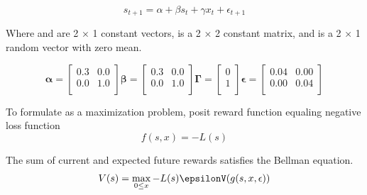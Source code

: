 \documentclass[a4paper,oneside]{article}
\begin{document}
\begin{equation}
	s_{t+1}= \alpha+\beta s_{t}+\gamma x_{t}+\epsilon_{t+1} 
	\label{eq:mye3}
\end{equation}

Where \textalpha \: and \textGamma \: are 2 × 1 constant vectors, \textbeta \: is a 2 × 2 constant matrix, and \textepsilon \: is a 2 × 1 random vector with zero mean. 

\begin{equation*}
	\bm{\alpha} =
		\left.
			\begin{bmatrix}
				0.3	&	0.0\\
				0.0	&	1.0\\
			\end{bmatrix} 
		\right.
	\bm{\beta} =      
		\left.
			\begin{bmatrix}
				0.3	&	0.0\\
				0.0	&	1.0\\
			\end{bmatrix} 
		\right.
	\bm{\Gamma} =
		\left.
			\begin{bmatrix}
				0	\\
				1	\\
			\end{bmatrix}
		\right.
	\bm{\epsilon} = 
		\left.
			\begin{bmatrix}
				0.04 &	0.00\\
				0.00 &	0.04\\
			\end{bmatrix}
		\right.
\end{equation*}

  To formulate as a maximization problem, posit reward function equaling negative loss function
  \begin{equation*}
	  f(s, x) = -L(s)
  \end{equation*}
  
  The sum of current and expected future rewards satisfies the Bellman equation.
  \begin{equation}
	  V(s) = \max\limits_{0 \leq x }{-L(s)\epsilonV(g(s,x,\epsilon))}
	  \label{eq:myeq3}
  \end{equation}
  
\end{document}
